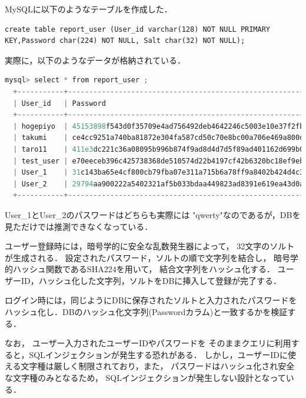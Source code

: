 \documentclass[a4paper,11pt]{jsreport}
\begin{document}
MySQLに以下のようなテーブルを作成した．
\begin{lstlisting}
create table report_user (User_id varchar(128) NOT NULL PRIMARY KEY,Password char(224) NOT NULL, Salt char(32) NOT NULL); 
\end{lstlisting}
実際に，以下のようなデータが格納されている．
\begin{lstlisting}[language=C, basicstyle={\ttfamily\tiny}]
  mysql> select * from report_user ;
  +-----------+----------------------------------------------------------+----------------------------------+
  | User_id   | Password                                                 | Salt                             |
  +-----------+----------------------------------------------------------+----------------------------------+
  | hogepiyo  | 45153898f543d0f35709e4ad756492deb4642246c5003e10e37f2fba | 0826cff6199ee36a806401d645b0e891 |
  | takumi    | ce4cc9251a740ba81872e304fa587cd50c70e8bc00a706e469a800d2 | f217f794617dc8ba66239e40e5292a2f |
  | taro11    | 411e3dc221c36a08095b996b874f9ad8d4d7d5f89ad401162d699b0a | 9f8960992cf66cb2b3501d5b15c1bd58 |
  | test_user | e70eeceb396c425738368de510574d22b4197cf42b6320bc18ef9eb6 | cc734bff340a6e0ded0a488c5eca8030 |
  | User_1    | 31c143ba65e4cf800cb79fba07e311a715b6a78ff9a8402b424d4c39 | 074c83a17e1a5d3769da6400646ddb2b |
  | User_2    | 29794aa900222a5402321af5b033bdaa449823ad8391e619ea43d0a5 | 1219633b8e6fc413aeed11412f7297b0 |
  +-----------+----------------------------------------------------------+----------------------------------+
\end{lstlisting}
User\_1とUser\_2のパスワードはどちらも実際には
"qwerty"なのであるが，DBを見ただけでは推測できなくなっている．

ユーザー登録時には，暗号学的に安全な乱数発生器によって，
32文字のソルトが生成される．
設定されたパスワード，ソルトの順で文字列を結合し，
暗号学的ハッシュ関数であるSHA224を用いて，
結合文字列をハッシュ化する．
ユーザーID，ハッシュ化した文字列，ソルトをDBに挿入して登録が完了する．

ログイン時には，同じようにDBに保存されたソルトと入力されたパスワードを
ハッシュ化し．DBのハッシュ化文字列(Passwordカラム)と一致するかを検証する．

なお，
ユーザー入力されたユーザーIDやパスワードを
そのままクエリに利用すると，SQLインジェクションが発生する恐れがある．
しかし，ユーザーIDに使える文字種は厳しく制限されており，また，
パスワードはハッシュ化され安全な文字種のみとなるため，
SQLインジェクションが発生しない設計となっている．
\end{document}
